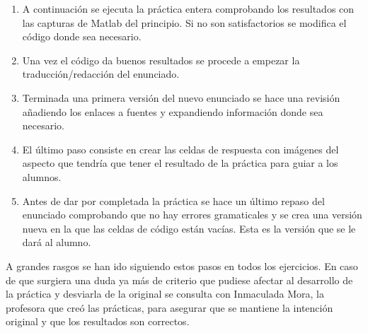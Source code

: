 \begin{enumerate}
    \item A continuación se ejecuta la práctica entera comprobando los resultados con las capturas de Matlab del principio. Si no son satisfactorios se modifica el código donde sea necesario.
    \item Una vez el código da buenos resultados se procede a empezar la traducción/redacción del enunciado.
    \item Terminada una primera versión del nuevo enunciado se hace una revisión añadiendo los enlaces a fuentes y expandiendo información donde sea necesario.
    \item El último paso consiste en crear las celdas de respuesta con imágenes del aspecto que tendría que tener el resultado de la práctica para guiar a los alumnos.
    \item Antes de dar por completada la práctica se hace un último repaso del enunciado comprobando que no hay errores gramaticales y se crea una versión nueva en la que las celdas de código están vacías. Esta es la versión que se le dará al alumno.
\end{enumerate}

A grandes rasgos se han ido siguiendo estos pasos en todos los ejercicios. En caso de que surgiera una duda ya más de criterio que pudiese afectar al desarrollo de la práctica y desviarla de la original se consulta con Inmaculada Mora, la profesora que creó las prácticas, para asegurar que se mantiene la intención original y que los resultados son correctos.